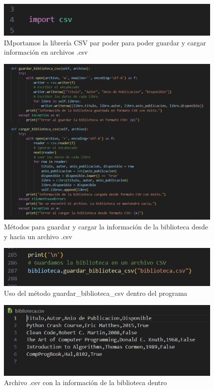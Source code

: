 \documentclass[11pt,a4paper]{article}
\begin{document}
\begin{figure}[H]
    \centering
    \includegraphics[width=0.5\linewidth]{images/10-1.png}
    \caption{IMportamos la librería CSV par poder para poder guardar y cargar información en archivos .csv}
    \label{fig:enter-label}
\end{figure}

\begin{figure}[H]
    \centering
    \includegraphics[width=0.8\linewidth]{images/10-2.png}
    \caption{Métodos para guardar y cargar la información de la biblioteca desde y hacia un archivo .csv}
    \label{fig:enter-label}
\end{figure}

\begin{figure}[H]
    \centering
    \includegraphics[width=1\linewidth]{images/10-3.png}
    \caption{Uso del método guardar_biblioteca_csv dentro del programa}
    \label{fig:enter-label}
\end{figure}

\begin{figure}[H]
    \centering
    \includegraphics[width=1\linewidth]{images/10-4.png}
    \caption{Archivo .csv con la información de la biblioteca dentro}
    \label{fig:enter-label}
\end{figure}
\end{document}
